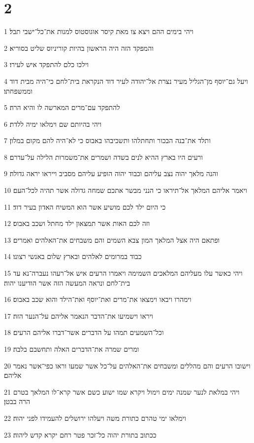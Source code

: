 \chapter{2}

\par 1 ויהי בימים ההם ויצא צו מאת קיסר אוגוסטוס למנות את־כל־ישבי תבל׃
\par 2 והמפקד הזה היה הראשון בהיות קוריניוס שליט בסוריא׃
\par 3 וילכו כלם להתפקד איש לעירו׃
\par 4 ויעל גם־יוסף מן־הגליל מעיר נצרת אל־יהודה לעיר דוד הנקראת בית־לחם כי־היה מבית דוד וממשפחתו׃
\par 5 להתפקד עם־מרים המארשה לו והיא הרה׃
\par 6 ויהי בהיותם שם וימלאו ימיה ללדת׃
\par 7 ותלד את־בנה הבכור ותחתלהו ותשכיבהו באבוס כי לא־היה להם מקום במלון׃
\par 8 ורעים היו בארץ ההיא לנים בשדה ושמרים את־משמרות הלילה על־עדרם׃
\par 9 והנה מלאך יהוה נצב עליהם וכבוד יהוה הופיע עליהם מסביב וייראו יראה גדולה׃
\par 10 ויאמר אליהם המלאך אל־תיראו כי הנני מבשר אתכם שמחה גדולה אשר תהיה לכל־העם׃
\par 11 כי היום ילד לכם מושיע אשר הוא המשיח האדון בעיר דוד׃
\par 12 וזה לכם האות אשר תמצאון ילד מחתל ושכב באבוס׃
\par 13 ופתאם היה אצל המלאך המון צבא השמים והם משבחים את־האלהים ואמרים׃
\par 14 כבוד במרומים לאלהים ובארץ שלום באנשי רצונו׃
\par 15 ויהי כאשר עלו מעליהם המלאכים השמימה ויאמרו הרעים איש אל־רעהו נעברה־נא עד בית־לחם ונראה המעשה הזה אשר הודיענו יהוה׃
\par 16 וימהרו ויבאו וימצאו את־מרים ואת־יוסף ואת־הילד והוא שכב באבוס׃
\par 17 ויראו וישמיעו את־הדבר הנאמר אליהם על־הנער הזה׃
\par 18 וכל־השמעים תמהו על הדברים אשר־דברו אליהם הרעים׃
\par 19 ומרים שמרה את־הדברים האלה ותחשבם בלבה׃
\par 20 וישובו הרעים והם מהללים ומשבחים את־האלהים על־כל אשר שמעו וראו כפי־אשר נאמר אליהם׃
\par 21 ויהי במלאת לנער שמנה ימים וימול ויקרא שמו ישוע כשם אשר קרא־לו המלאך בטרם הרה בבטן׃
\par 22 וימלאו ימי טהרם כתורת משה ויעלהו ירושלים להעמידו לפני יהוה׃
\par 23 ככתוב בתורת יהוה כל־זכר פטר רחם יקרא קדש ליהוה׃

